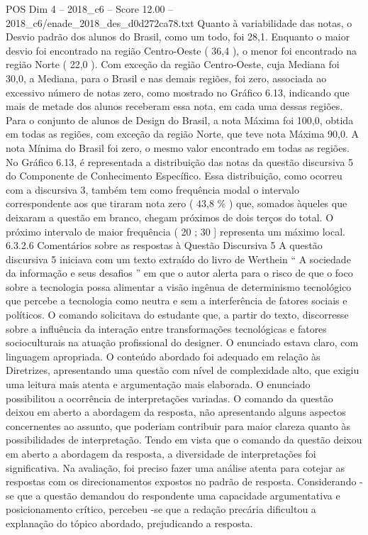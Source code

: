 \begin{textsample}{POS Dim 4 – 2018\_c6 – Score 12.00 – 2018\_c6/enade\_2018\_des\_d0d272ca78.txt}
Quanto à variabilidade das notas, o Desvio padrão dos alunos do Brasil, como um todo, foi 28,1.
Enquanto o maior desvio foi encontrado na região Centro-Oeste ( 36,4 ), o menor foi encontrado na região Norte ( 22,0 ).
Com exceção da região Centro-Oeste, cuja Mediana foi 30,0, a Mediana, para o Brasil e nas demais regiões, foi zero, associada ao excessivo número de notas zero, como mostrado no Gráfico 6.13, indicando que mais de metade dos alunos receberam essa nota, em cada uma dessas regiões.
Para o conjunto de alunos de Design do Brasil, a nota Máxima foi 100,0, obtida em todas as regiões, com exceção da região Norte, que teve nota Máxima 90,0.
A nota Mínima do Brasil foi zero, o mesmo valor encontrado em todas as regiões.
No Gráfico 6.13, é representada a distribuição das notas da questão discursiva 5 do Componente de Conhecimento Específico.
Essa distribuição, como ocorreu com a discursiva 3, também tem como frequência modal o intervalo correspondente aos que tiraram nota zero ( 43,8 \% ) que, somados àqueles que deixaram a questão em branco, chegam próximos de dois terços do total.
O próximo intervalo de maior frequência ( 20 ; 30 ] representa um máximo local. 6.3.2.6 Comentários sobre as respostas à Questão Discursiva 5 A questão discursiva 5 iniciava com um texto extraído do livro de Werthein “ A sociedade da informação e seus desafios ” em que o autor alerta para o risco de que o foco sobre a tecnologia possa alimentar a visão ingênua de determinismo tecnológico que percebe a tecnologia como neutra e sem a interferência de fatores sociais e políticos.
O comando solicitava do estudante que, a partir do texto, discorresse sobre a influência da interação entre transformações tecnológicas e fatores socioculturais na atuação profissional do designer.
O enunciado estava claro, com linguagem apropriada.
O conteúdo abordado foi adequado em relação às Diretrizes, apresentando uma questão com nível de complexidade alto, que exigiu uma leitura mais atenta e argumentação mais elaborada.
O enunciado possibilitou a ocorrência de interpretações variadas.
O comando da questão deixou em aberto a abordagem da resposta, não apresentando alguns aspectos concernentes ao assunto, que poderiam contribuir para maior clareza quanto às possibilidades de interpretação.
Tendo em vista que o comando da questão deixou em aberto a abordagem da resposta, a diversidade de interpretações foi significativa.
Na avaliação, foi preciso fazer uma análise atenta para cotejar as respostas com os direcionamentos expostos no padrão de resposta.
Considerando -se que a questão demandou do respondente uma capacidade argumentativa e posicionamento crítico, percebeu -se que a redação precária dificultou a explanação do tópico abordado, prejudicando a resposta.

\end{textsample}
